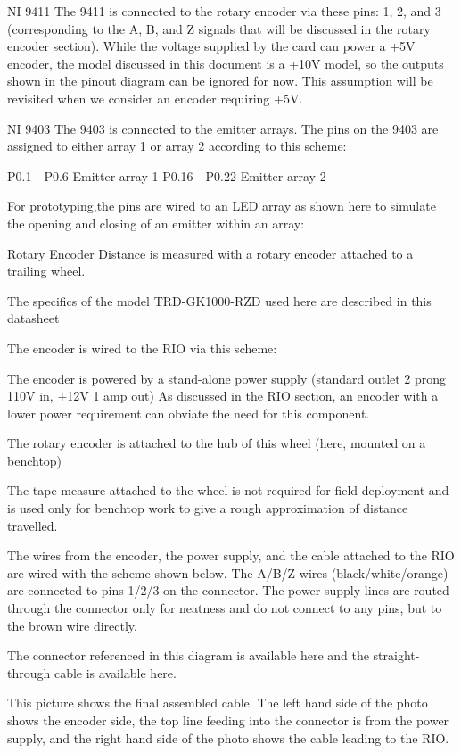\documentclass[letterpaper]{article}
\begin{document}
NI 9411
The 9411 is connected to the rotary encoder via these pins: 1, 2, and 3 (corresponding to the A, B, and Z signals that will be discussed in the rotary encoder section).  While the voltage supplied by the card can power a +5V encoder, the model discussed in this document is a +10V model, so the outputs shown in the pinout diagram can be ignored for now. This assumption will be revisited when we consider an encoder requiring +5V.



NI 9403
The 9403 is connected to the emitter arrays. The pins on the 9403 are assigned to either array 1 or array 2 according to this scheme:



P0.1 - P0.6 Emitter array 1
P0.16 - P0.22 Emitter array 2

For prototyping,the pins are wired to an LED array as shown here to simulate the opening and closing of an emitter within an array:


Rotary Encoder
Distance is measured with a rotary encoder attached to a trailing wheel.

The specifics of the model TRD-GK1000-RZD used here are described in this datasheet

The encoder is wired to the RIO via this scheme:

The encoder is powered by a stand-alone power supply (standard outlet 2 prong 110V in, +12V 1 amp out) As discussed in the RIO section, an encoder with a lower power requirement can obviate the need for this component.

The rotary encoder is attached to the hub of this wheel (here, mounted on a benchtop)



The tape measure attached to the wheel is not required for field deployment and is used only for benchtop work to give a rough approximation of distance travelled.

The wires from the encoder, the power supply, and the cable attached to the RIO are wired with the scheme shown below.  The A/B/Z wires (black/white/orange) are connected to pins 1/2/3 on the connector. The power supply lines are routed through the connector only for neatness and do not connect to any pins, but to the brown wire directly. 

The connector referenced in this diagram is available here and the straight-through cable is available here.


This picture shows the final assembled cable.  The left hand side of the photo shows the encoder side, the top line feeding into the connector is from the power supply, and the right hand side of the photo shows the cable leading to the RIO.
\end{document}
